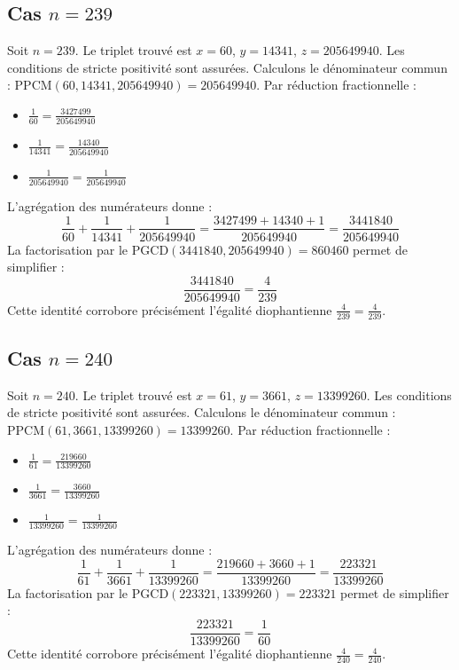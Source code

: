 \documentclass[11pt,a4paper]{article}
\begin{document}
\subsection{Cas $n = 239$}
Soit $n = 239$. Le triplet trouvé est $x = 60$, $y = 14341$, $z = 205649940$.
Les conditions de stricte positivité sont assurées.
Calculons le dénominateur commun : $\text{PPCM}(60, 14341, 205649940) = 205649940$.
Par réduction fractionnelle :
\begin{itemize}
    \item $\frac{1}{60} = \frac{3427499}{205649940}$
    \item $\frac{1}{14341} = \frac{14340}{205649940}$
    \item $\frac{1}{205649940} = \frac{1}{205649940}$
\end{itemize}
L'agrégation des numérateurs donne :
$$ \frac{1}{60} + \frac{1}{14341} + \frac{1}{205649940} = \frac{3427499 + 14340 + 1}{205649940} = \frac{3441840}{205649940} $$
La factorisation par le $\text{PGCD}(3441840, 205649940) = 860460$ permet de simplifier :
$$ \frac{3441840}{205649940} = \frac{4}{239} $$
Cette identité corrobore précisément l'égalité diophantienne $\frac{4}{239} = \frac{4}{239}$.

\subsection{Cas $n = 240$}
Soit $n = 240$. Le triplet trouvé est $x = 61$, $y = 3661$, $z = 13399260$.
Les conditions de stricte positivité sont assurées.
Calculons le dénominateur commun : $\text{PPCM}(61, 3661, 13399260) = 13399260$.
Par réduction fractionnelle :
\begin{itemize}
    \item $\frac{1}{61} = \frac{219660}{13399260}$
    \item $\frac{1}{3661} = \frac{3660}{13399260}$
    \item $\frac{1}{13399260} = \frac{1}{13399260}$
\end{itemize}
L'agrégation des numérateurs donne :
$$ \frac{1}{61} + \frac{1}{3661} + \frac{1}{13399260} = \frac{219660 + 3660 + 1}{13399260} = \frac{223321}{13399260} $$
La factorisation par le $\text{PGCD}(223321, 13399260) = 223321$ permet de simplifier :
$$ \frac{223321}{13399260} = \frac{1}{60} $$
Cette identité corrobore précisément l'égalité diophantienne $\frac{4}{240} = \frac{4}{240}$.
\end{document}
